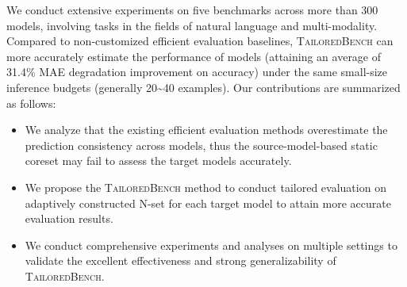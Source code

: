 We conduct extensive experiments on five benchmarks across more than 300 models, involving tasks in the fields of natural language and multi-modality. Compared to non-customized efficient evaluation baselines, \textsc{TailoredBench} can more accurately estimate the performance of models (attaining an average of 31.4\% MAE degradation improvement on accuracy) under the same small-size inference budgets (generally 20\textasciitilde 40 examples). Our contributions are summarized as follows:
\begin{itemize}[leftmargin=20pt]
\setlength{\itemsep}{0pt}
\setlength{\parsep}{0pt}
\setlength{\parskip}{0pt}
\item We analyze that the existing efficient evaluation methods overestimate the prediction consistency across models, thus the source-model-based static coreset may fail to assess the target models accurately.
\item We propose the \textsc{TailoredBench} method to conduct tailored evaluation on adaptively constructed N-set for each target model to attain more accurate evaluation results.
\item We conduct comprehensive experiments and analyses on multiple settings to validate the excellent effectiveness and strong generalizability of \textsc{TailoredBench}.
\end{itemize}



